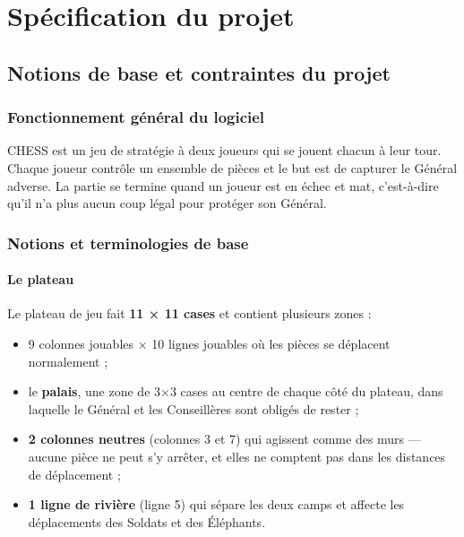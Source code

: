 \newpage
\section{Spécification du projet}
\subsection{Notions de base et contraintes du projet}
\label{sec:spec1}
\subsubsection{Fonctionnement général du logiciel}
CHESS est un jeu de stratégie à deux joueurs qui se jouent chacun à leur tour. Chaque joueur contrôle un ensemble de pièces et le but est de capturer le Général adverse. La partie se termine quand un joueur est en échec et mat, c'est-à-dire qu'il n'a plus aucun coup légal pour protéger son Général.
\subsubsection{Notions et terminologies de base}
\paragraph{Le plateau} Le plateau de jeu fait \textbf{11 × 11 cases} et contient plusieurs zones :
\begin{itemize}
\item 9 colonnes jouables × 10 lignes jouables où les pièces se déplacent normalement ;
\item le \textbf{palais}, une zone de 3×3 cases au centre de chaque côté du plateau, dans laquelle le Général et les Conseillères sont obligés de rester ;
\item \textbf{2 colonnes neutres} (colonnes 3 et 7) qui agissent comme des murs — aucune pièce ne peut s'y arrêter, et elles ne comptent pas dans les distances de déplacement ;
\item \textbf{1 ligne de rivière} (ligne 5) qui sépare les deux camps et affecte les déplacements des Soldats et des Éléphants.
\end{itemize}
